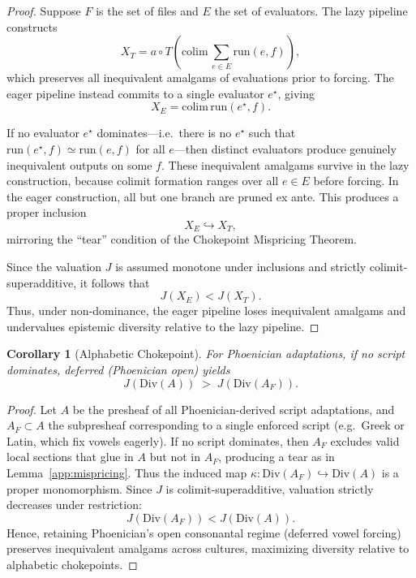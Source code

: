 \documentclass[12pt]{article}
\newtheorem{corollary}{Corollary}
\theoremstyle{remark}
\begin{document}
\begin{proof}
Suppose $F$ is the set of files and $E$ the set of evaluators. 
The lazy pipeline constructs
\[
X_T = a \circ T\!\left(\mathrm{colim}\,\sum_{e \in E} \mathrm{run}(e,f)\right),
\]
which preserves all inequivalent amalgams of evaluations prior to forcing.  
The eager pipeline instead commits to a single evaluator $e^\star$, giving
\[
X_E = \mathrm{colim}\,\mathrm{run}(e^\star,f).
\]

If no evaluator $e^\star$ dominates—i.e.\ there is no $e^\star$ such that 
$\mathrm{run}(e^\star,f) \simeq \mathrm{run}(e,f)$ for all $e$—then distinct evaluators produce genuinely inequivalent outputs on some $f$. 
These inequivalent amalgams survive in the lazy construction, because colimit formation ranges over all $e \in E$ before forcing. 
In the eager construction, all but one branch are pruned ex ante. 
This produces a proper inclusion
\[
X_E \hookrightarrow X_T,
\]
mirroring the “tear” condition of the Chokepoint Mispricing Theorem.

Since the valuation $J$ is assumed monotone under inclusions and strictly colimit-superadditive, 
it follows that
\[
J(X_E) < J(X_T).
\]
Thus, under non-dominance, the eager pipeline loses inequivalent amalgams and undervalues epistemic diversity relative to the lazy pipeline.
\end{proof}


\begin{corollary}[Alphabetic Chokepoint]
For Phoenician adaptations, if no script dominates, deferred (Phoenician open) yields
\[
J(\mathrm{Div}(A)) \;>\; J(\mathrm{Div}(A_F)).
\]
\end{corollary}

\begin{proof}
Let $A$ be the presheaf of all Phoenician-derived script adaptations, and $A_F \subset A$ the subpresheaf corresponding to a single enforced script (e.g.\ Greek or Latin, which fix vowels eagerly).
If no script dominates, then $A_F$ excludes valid local sections that glue in $A$ but not in $A_F$, producing a tear as in Lemma~\ref{app:mispricing}.
Thus the induced map $\kappa:\mathrm{Div}(A_F) \hookrightarrow \mathrm{Div}(A)$ is a proper monomorphism.
Since $J$ is colimit-superadditive, valuation strictly decreases under restriction:
\[
J(\mathrm{Div}(A_F)) < J(\mathrm{Div}(A)).
\]
Hence, retaining Phoenician’s open consonantal regime (deferred vowel forcing) preserves inequivalent amalgams across cultures, maximizing diversity relative to alphabetic chokepoints.
\end{proof}
\end{document}
